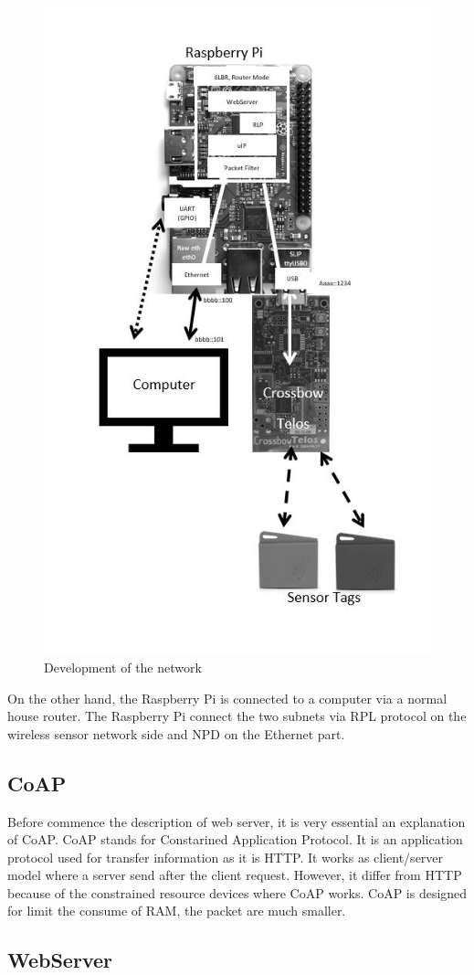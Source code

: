 \begin{figure}[!h]
	\includegraphics[width=\linewidth]{Network}
	\caption{Development of the network}
	\label{fig:Network}
\end{figure}
On the other hand, the Raspberry Pi is connected to a computer via a normal house router.\cite{6lbr}
The Raspberry Pi connect the two subnets via RPL protocol on the wireless sensor network side and NPD on the Ethernet part.\cite{mode}\\

\subsection{CoAP}
Before commence the description of web server, it is very essential an explanation of CoAP. CoAP stands for Constarined Application Protocol. It is an application protocol used for transfer information as it is HTTP. It works as client/server model where a server send after the client request. However, it differ from HTTP because of the constrained resource devices where CoAP works. CoAP is designed for limit the consume of RAM, the packet are much smaller. \cite{coap}

\subsection{WebServer}




